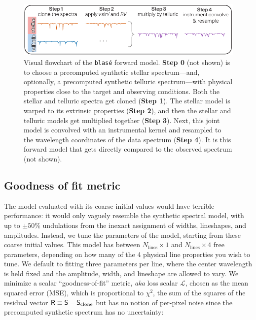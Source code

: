\documentclass[twocolumn]{aastex631}
\begin{document}
\begin{figure}[hbt!]
    \centering
    \includegraphics[width=1.0\textwidth]{figures/blase_flowchart03.pdf}
    \caption{Visual flowchart of the \texttt{blas\'e} forward model.  \textbf{Step 0} (not shown) is to choose a precomputed synthetic stellar spectrum---and, optionally, a precomputed synthetic telluric spectrum---with physical properties close to the target and observing conditions.  Both the stellar and telluric spectra get cloned (\textbf{Step 1}).  The stellar model is warped to its extrinsic properties (\textbf{Step 2}), and then the stellar and telluric models get multiplied together (\textbf{Step 3}).  Next, this joint model is convolved with an instrumental kernel and resampled to the wavelength coordinates of the data spectrum (\textbf{Step 4}).  It is this forward model that gets directly compared to the observed spectrum (not shown).
    }
    \label{blase_flowchart}
\end{figure}

\subsection{Goodness of fit metric}
The model evaluated with its coarse initial values would have terrible performance: it would only vaguely resemble the synthetic spectral model, with up to $\pm 50\%$ undulations from the inexact assignment of widths, lineshapes, and amplitudes. Instead, we tune the parameters of the model, starting from these coarse initial values. This model has between $N_{\mathrm{lines}}\times 1$ and $N_{\mathrm{lines}}\times 4$ free parameters, depending on how many of the 4 physical line properties you wish to tune.  We default to fitting three parameters per line, where the center wavelength is held fixed and the amplitude, width, and lineshape are allowed to vary. We minimize a scalar ``goodness-of-fit'' metric, \emph{aka} loss scalar $\mathcal{L}$, chosen as the mean squared error (MSE), which is proportional to $\chi^2$, the sum of the squares of the residual vector $\mathsf{R} \equiv \mathsf{S}-\mathsf{S}_{\rm clone}$ but has no notion of per-pixel noise since the precomputed synthetic spectrum has no uncertainty:
\end{document}
